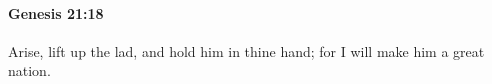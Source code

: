 
		\paragraph{Genesis 21:18} %
			\label{GENESIS-21-18}

			Arise, lift up the lad, and hold him in thine hand; for I will make him a great nation.


